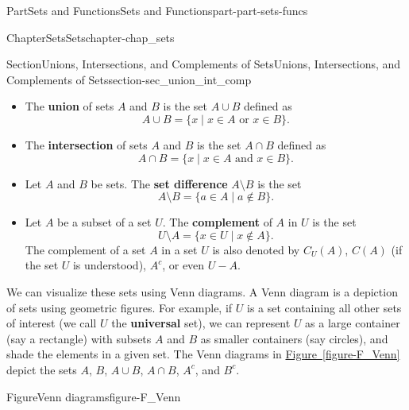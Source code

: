 \documentclass[oneside,10pt,]{book}
\newcommand{\xreffont}{\relax}
\newcommand{\terminology}[1]{\textbf{#1}}
\numberwithin{equation}{chapter}
\begin{document}
\begin{partptx}{Part}{Sets and Functions}{}{Sets and Functions}{}{}{part-part-sets-funcs}
\begin{chapterptx}{Chapter}{Sets}{}{Sets}{}{}{chapter-chap_sets}
\begin{sectionptx}{Section}{Unions, Intersections, and Complements of Sets}{}{Unions, Intersections, and Complements of Sets}{}{}{section-sec_union_int_comp}
\begin{itemize}[label=\textbullet]
\item{}The \terminology{union} of sets \(A\) and \(B\) is the set \(A \cup B\) defined as%
\begin{equation*}
A \cup B = \{x \mid x \in A \text{ or }  x \in B\}\text{.}
\end{equation*}
%
\item{}The \terminology{intersection}  of sets \(A\) and \(B\) is the set \(A \cap B\) defined as%
\begin{equation*}
A \cap B = \{x \mid x \in A \text{ and }  x \in B\}\text{.}
\end{equation*}
%
\item{}Let \(A\) and \(B\) be sets. The \terminology{set difference}  \(A \setminus B\) is the set%
\begin{equation*}
A \setminus B = \{a \in A \mid a \notin B\}\text{.}
\end{equation*}
%
\item{}Let \(A\) be a subset of a set \(U\). The \terminology{complement}  of \(A\) in \(U\) is the set%
\begin{equation*}
U \setminus A = \{x \in U \mid x \notin A\}\text{.}
\end{equation*}
The complement of a set \(A\) in a set \(U\) is also denoted by \(C_U(A)\), \(C(A)\) (if the set \(U\) is understood), \(A^c\), or even \(U-A\).%
\end{itemize}
%
\par
We can visualize these sets using Venn diagrams. A Venn diagram is a depiction of sets using geometric figures. For example, if \(U\) is a set containing all other sets of interest (we call \(U\) the \terminology{universal} set), we can represent \(U\) as a large container (say a rectangle) with subsets \(A\) and \(B\) as smaller containers (say circles), and shade the elements in a given set. The Venn diagrams in \hyperref[figure-F_Venn]{Figure~{\xreffont\ref{figure-F_Venn}}} depict the sets \(A\), \(B\), \(A \cup B\), \(A \cap B\), \(A^c\), and \(B^c\).%
\begin{figureptx}{Figure}{Venn diagrams}{figure-F_Venn}{}%
\centering
\begin{sidebyside}{3}{0}{0}{0}%
\begin{sbspanel}{0.333333333333333}%

\end{sbspanel}
\end{sidebyside}
\end{figureptx}
\end{sectionptx}
\end{chapterptx}
\end{partptx}
\end{document}
